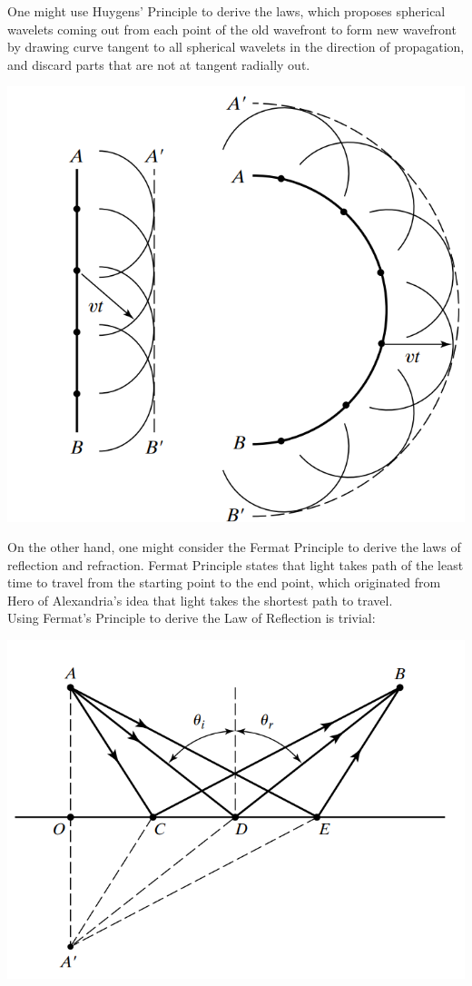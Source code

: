 \documentclass[11pt]{book}
\theoremstyle{break}
\theoremstyle{break}
\begin{document}
One might use Huygens' Principle to derive the laws, which proposes spherical wavelets coming out from each point of the old wavefront to form new wavefront by drawing curve tangent to all spherical wavelets in the direction of propagation, and discard parts that are not at tangent radially out. \\
\begin{center}
\includegraphics[scale=0.39]{Huygens.png}
\end{center}

\hfill\break
On the other hand, one might consider the Fermat Principle to derive the laws of reflection and refraction. Fermat Principle states that light takes path of the least time to travel from the starting point to the end point, which originated from Hero of Alexandria's idea that light takes the shortest path to travel.\\

Using Fermat's Principle to derive the Law of Reflection is trivial:
\begin{center}
\includegraphics[scale=0.45]{Fermat1.png}
\end{center}
\end{document}
